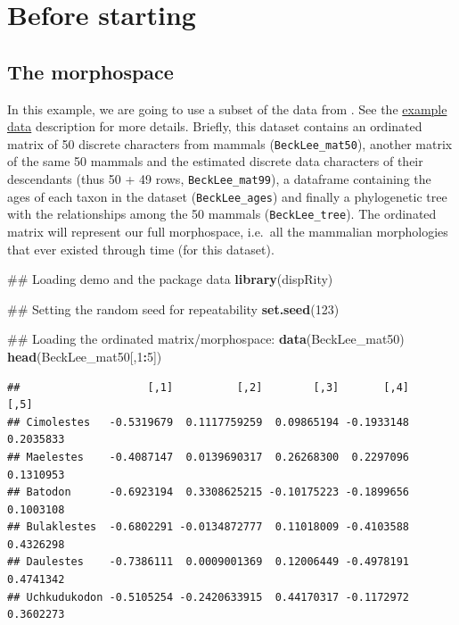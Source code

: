 \documentclass[]{book}
\newenvironment{Shaded}{\begin{snugshade}}{\end{snugshade}}
\newcommand{\KeywordTok}[1]{\textcolor[rgb]{0.13,0.29,0.53}{\textbf{#1}}}
\newcommand{\DecValTok}[1]{\textcolor[rgb]{0.00,0.00,0.81}{#1}}
\newcommand{\OperatorTok}[1]{\textcolor[rgb]{0.81,0.36,0.00}{\textbf{#1}}}
\newcommand{\NormalTok}[1]{#1}
\theoremstyle{definition}
\theoremstyle{definition}
\theoremstyle{remark}
\begin{document}
\section{Before starting}\label{before-starting}

\subsection{The morphospace}\label{the-morphospace}

In this example, we are going to use a subset of the data from
\citet{beckancient2014}. See the
\protect\hyperlink{example-data}{example data} description for more
details. Briefly, this dataset contains an ordinated matrix of 50
discrete characters from mammals (\texttt{BeckLee\_mat50}), another
matrix of the same 50 mammals and the estimated discrete data characters
of their descendants (thus 50 + 49 rows, \texttt{BeckLee\_mat99}), a
dataframe containing the ages of each taxon in the dataset
(\texttt{BeckLee\_ages}) and finally a phylogenetic tree with the
relationships among the 50 mammals (\texttt{BeckLee\_tree}). The
ordinated matrix will represent our full morphospace, i.e.~all the
mammalian morphologies that ever existed through time (for this
dataset).

\begin{Shaded}
\begin{Highlighting}[]
\NormalTok{## Loading demo and the package data}
\KeywordTok{library}\NormalTok{(dispRity)}

\NormalTok{## Setting the random seed for repeatability}
\KeywordTok{set.seed}\NormalTok{(}\DecValTok{123}\NormalTok{)}

\NormalTok{## Loading the ordinated matrix/morphospace:}
\KeywordTok{data}\NormalTok{(BeckLee_mat50)}
\KeywordTok{head}\NormalTok{(BeckLee_mat50[,}\DecValTok{1}\OperatorTok{:}\DecValTok{5}\NormalTok{])}
\end{Highlighting}
\end{Shaded}

\begin{verbatim}
##                    [,1]          [,2]        [,3]       [,4]      [,5]
## Cimolestes   -0.5319679  0.1117759259  0.09865194 -0.1933148 0.2035833
## Maelestes    -0.4087147  0.0139690317  0.26268300  0.2297096 0.1310953
## Batodon      -0.6923194  0.3308625215 -0.10175223 -0.1899656 0.1003108
## Bulaklestes  -0.6802291 -0.0134872777  0.11018009 -0.4103588 0.4326298
## Daulestes    -0.7386111  0.0009001369  0.12006449 -0.4978191 0.4741342
## Uchkudukodon -0.5105254 -0.2420633915  0.44170317 -0.1172972 0.3602273
\end{verbatim}
\end{document}

